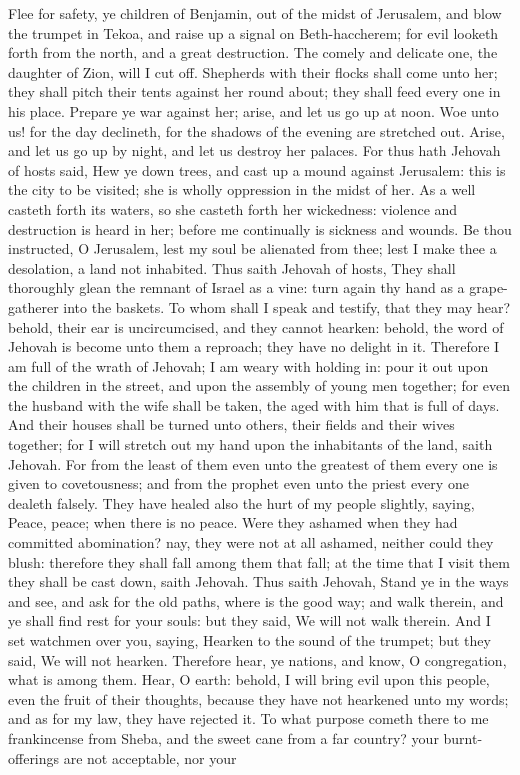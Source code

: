 Flee for safety, ye children of Benjamin, out of the midst of Jerusalem, and blow the trumpet in Tekoa, and raise up a signal on Beth-haccherem; for evil looketh forth from the north, and a great destruction. The comely and delicate one, the daughter of Zion, will I cut off. Shepherds with their flocks shall come unto her; they shall pitch their tents against her round about; they shall feed every one in his place. Prepare ye war against her; arise, and let us go up at noon. Woe unto us! for the day declineth, for the shadows of the evening are stretched out. Arise, and let us go up by night, and let us destroy her palaces. For thus hath Jehovah of hosts said, Hew ye down trees, and cast up a mound against Jerusalem: this is the city to be visited; she is wholly oppression in the midst of her. As a well casteth forth its waters, so she casteth forth her wickedness: violence and destruction is heard in her; before me continually is sickness and wounds. Be thou instructed, O Jerusalem, lest my soul be alienated from thee; lest I make thee a desolation, a land not inhabited.  Thus saith Jehovah of hosts, They shall thoroughly glean the remnant of Israel as a vine: turn again thy hand as a grape-gatherer into the baskets. To whom shall I speak and testify, that they may hear? behold, their ear is uncircumcised, and they cannot hearken: behold, the word of Jehovah is become unto them a reproach; they have no delight in it. Therefore I am full of the wrath of Jehovah; I am weary with holding in: pour it out upon the children in the street, and upon the assembly of young men together; for even the husband with the wife shall be taken, the aged with him that is full of days. And their houses shall be turned unto others, their fields and their wives together; for I will stretch out my hand upon the inhabitants of the land, saith Jehovah. For from the least of them even unto the greatest of them every one is given to covetousness; and from the prophet even unto the priest every one dealeth falsely. They have healed also the hurt of my people slightly, saying, Peace, peace; when there is no peace. Were they ashamed when they had committed abomination? nay, they were not at all ashamed, neither could they blush: therefore they shall fall among them that fall; at the time that I visit them they shall be cast down, saith Jehovah.  Thus saith Jehovah, Stand ye in the ways and see, and ask for the old paths, where is the good way; and walk therein, and ye shall find rest for your souls: but they said, We will not walk therein. And I set watchmen over you, saying, Hearken to the sound of the trumpet; but they said, We will not hearken. Therefore hear, ye nations, and know, O congregation, what is among them. Hear, O earth: behold, I will bring evil upon this people, even the fruit of their thoughts, because they have not hearkened unto my words; and as for my law, they have rejected it. To what purpose cometh there to me frankincense from Sheba, and the sweet cane from a far country? your burnt-offerings are not acceptable, nor your 